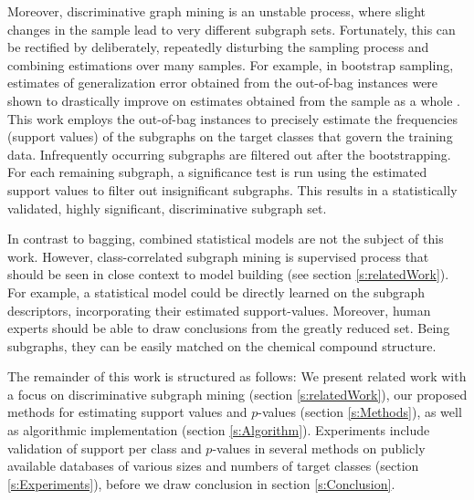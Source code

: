 \documentclass{article}
\begin{document}
Moreover, discriminative graph mining is an unstable process, where slight
changes in the sample lead to very different subgraph sets. Fortunately, this
can be rectified by deliberately, repeatedly disturbing the sampling process
and combining estimations over many samples. For example, in bootstrap
sampling, estimates of generalization error obtained from the out-of-bag
instances were shown to drastically improve on estimates obtained from the
sample as a whole \cite{bylander02estimating, breiman96oob}.  This work employs
the out-of-bag instances to precisely estimate the frequencies (support values)
of the subgraphs on the target classes that govern the training data.
Infrequently occurring subgraphs are filtered out after the bootstrapping.  For
each remaining subgraph, a significance test is run using the estimated support
values to filter out insignificant subgraphs. This results in a statistically
validated, highly significant, discriminative subgraph set.  

In contrast to bagging, combined statistical models are not the subject of this
work.  However, class-correlated subgraph mining is supervised process that
should be seen in close context to model building (see section
\ref{s:relatedWork}). For example, a statistical model could be directly
learned on the subgraph descriptors, incorporating their estimated
support-values. Moreover, human experts should be able to draw conclusions from
the greatly reduced set. Being subgraphs, they can be easily matched on the
chemical compound structure.

The remainder of this work is structured as follows: We present related work
with a focus on discriminative subgraph mining (section \ref{s:relatedWork}),
our proposed methods for estimating support values and $p$-values (section
\ref{s:Methods}), as well as algorithmic implementation
(section \ref{s:Algorithm}). Experiments include validation of support
per class and $p$-values in several methods on publicly available databases of
various sizes and numbers of target classes (section \ref{s:Experiments}),
before we draw conclusion in section \ref{s:Conclusion}.
\end{document}
